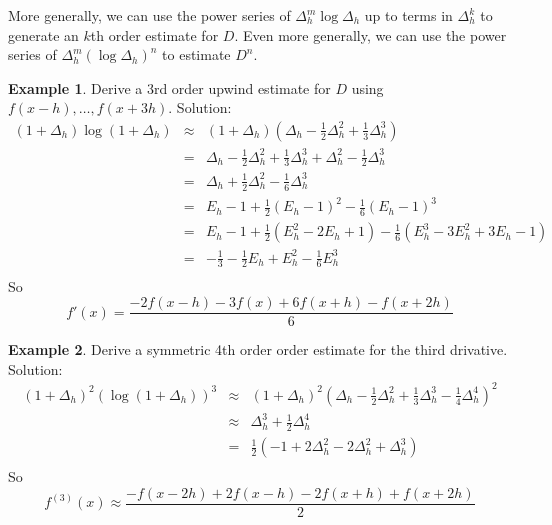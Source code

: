 \documentclass[a4paper]{article}
\theoremstyle{definition}
\newtheorem{example}{Example}[section]
\begin{document}
More generally, we can use the power series of $\Delta_h^m\log\Delta_h$ up to terms in $\Delta_h^k$ to generate an $k$th order estimate for $D$.
Even more generally, we can use the power series of $\Delta_h^m(\log\Delta_h)^n$ to estimate $D^n$.

\begin{example}
Derive a 3rd order upwind estimate for $D$ using $f(x-h),\ldots,f(x+3h)$.
Solution:
\begin{eqnarray*}
(1+\Delta_h)\log(1+\Delta_h) & \approx & (1+\Delta_h)(\Delta_h-\frac{1}{2}\Delta_h^2+\frac{1}{3}\Delta_h^3) \\
& = & \Delta_h-\frac{1}{2}\Delta_h^2+\frac{1}{3}\Delta_h^3+\Delta_h^2-\frac{1}{2}\Delta_h^3 \\
& = & \Delta_h+\frac{1}{2}\Delta_h^2-\frac{1}{6}\Delta_h^3 \\
& = & E_h-1+\frac{1}{2}(E_h-1)^2-\frac{1}{6}(E_h-1)^3 \\
& = & E_h-1+\frac{1}{2}(E_h^2-2E_h+1)-\frac{1}{6}(E_h^3-3E_h^2+3E_h-1) \\
& = & -\frac{1}{3}-\frac{1}{2}E_h+E_h^2-\frac{1}{6}E_h^3 \\
\end{eqnarray*}
So 
\[
f'(x) = \frac{-2f(x-h)-3f(x)+6f(x+h)-f(x+2h)}{6}
\]
\end{example}

\begin{example}
Derive a symmetric 4th order order estimate for the third drivative.
Solution:
\begin{eqnarray*}
(1+\Delta_h)^2(\log(1+\Delta_h))^3 & \approx &
(1+\Delta_h)^2(\Delta_h-\frac{1}{2}\Delta_h^2+\frac{1}{3}\Delta_h^3-\frac{1}{4}\Delta_h^4)^2 \\
& \approx & \Delta_h^3+\frac{1}{2}\Delta_h^4 \\
& = & \frac{1}{2}(-1+2\Delta_h^2-2\Delta_h^2+\Delta_h^3) \\
\end{eqnarray*}
So
\[
f^{(3)}(x) \approx \frac{-f(x-2h)+2f(x-h)-2f(x+h)+f(x+2h)}{2}
\]
\end{example}
\end{document}
